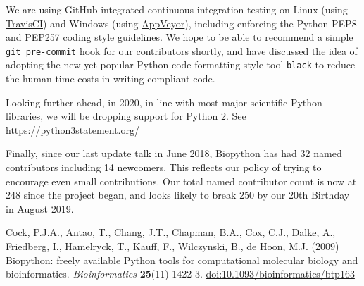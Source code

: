 \documentclass[10pt,oneside]{article}
\begin{document}
We are using GitHub-integrated continuous integration testing on Linux (using
\href{https://travis-ci.org/biopython/biopython/builds}{TravisCI}) and Windows
(using \href{https://ci.appveyor.com/project/biopython/biopython/history}{AppVeyor}),
including enforcing the Python PEP8 and PEP257 coding style guidelines.
We hope to be able to recommend a simple \texttt{git pre-commit} hook
for our contributors shortly, and have discussed the idea of adopting the
new yet popular Python code formatting style tool \texttt{black} to reduce
the human time costs in writing compliant code.

Looking further ahead, in 2020, in line with most major scientific Python
libraries, we will be dropping support for Python 2. See \url{https://python3statement.org/}

Finally, since our last update talk in June 2018, Biopython has had 32 named
contributors including 14 newcomers. This reflects our policy of trying to
encourage even small contributions.
Our total named contributor count is now at 248 since the project began, and
looks likely to break 250 by our 20th Birthday in August 2019.

\begin{thebibliography}{}

Cock, P.J.A., Antao, T., Chang, J.T., Chapman, B.A., Cox, C.J., Dalke, A., Friedberg, I., Hamelryck, T., Kauff, F., Wilczynski, B., de Hoon, M.J. (2009) Biopython: freely available Python tools for computational molecular biology and bioinformatics. {\it Bioinformatics} {\bf 25}(11) 1422-3. \href{http://dx.doi.org/10.1093/bioinformatics/btp163}{doi:10.1093/bioinformatics/btp163}

\end{thebibliography}
\end{document}
